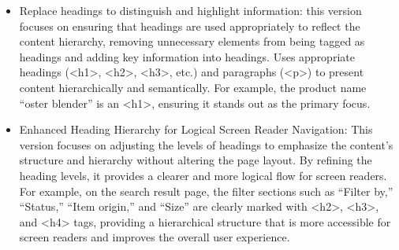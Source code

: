 \begin{itemize}
    \item Replace headings to distinguish and highlight information: this version focuses on ensuring that headings are used appropriately to reflect the content hierarchy, removing unnecessary elements from being tagged as headings and adding key information into headings. Uses appropriate headings (<h1>, <h2>, <h3>, etc.) and paragraphs (<p>) to present content hierarchically and semantically. For example, the product name ``oster blender'' is an <h1>, ensuring it stands out as the primary focus. 
    \item Enhanced Heading Hierarchy for Logical Screen Reader Navigation: This version focuses on adjusting the levels of headings to emphasize the content's structure and hierarchy without altering the page layout. By refining the heading levels, it provides a clearer and more logical flow for screen readers. For example, on the search result page, the filter sections such as ``Filter by,'' ``Status,'' ``Item origin,'' and ``Size'' are clearly marked with <h2>, <h3>, and <h4> tags, providing a hierarchical structure that is more accessible for screen readers and improves the overall user experience.
\end{itemize}
\vspace{-0.14in}